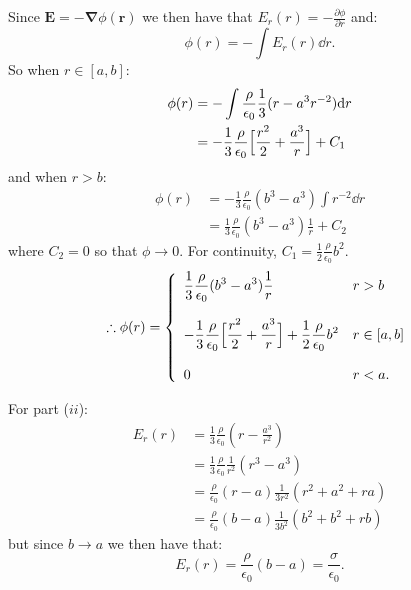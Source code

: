 \begin{enumerate}
    \newpage

    Since $\boldsymbol{E}=
    -\boldsymbol{\nabla}\phi
    (\boldsymbol{r})$ we then have that
    $E_r(r)=-\displaystyle
    \frac{\partial\phi}{\partial r}$
    and:
    $$\phi(r)=-\int E_r(r)\dd r.$$
    So when $r\in[a,b]$:
    \begin{align*}
        \phi(r)
        &=-\int\frac{\rho}{\epsilon_0}
        \frac{1}{3}(r-a^3 r^{-2})\dd r \\
        &=-\frac{1}{3}\frac{\rho}{\epsilon_0}
        \Bigl[\frac{r^2}{2}+\frac{a^3}{r}\Bigr]+C_1
    \end{align*}
    and when $r>b$:
    \begin{align*}
        \phi(r)
        &=-\frac{1}{3}
        \frac{\rho}{\epsilon_0}
        (b^3-a^3)
        \int r^{-2}\dd r \\
        &=\frac{1}{3}\frac{\rho}
        {\epsilon_0}(b^3-a^3)
        \frac{1}{r}+C_2
    \end{align*}
    where $C_2=0$ so that $\phi\rightarrow0$.
    For continuity, $C_1=\displaystyle
    \frac{1}{2}\frac{\rho}{\epsilon_0}b^2$.
    $$\therefore\phi(r)=
    \left\{
	\begin{array}{ll}
        \displaystyle\frac{1}{3}\frac{\rho}
        {\epsilon_0}(b^3-a^3)
        \frac{1}{r}
        & \mbox{$r>b$} \\\\
		\displaystyle-\frac{1}{3}\frac{\rho}{\epsilon_0}
        \Bigl[\frac{r^2}{2}+\frac{a^3}{r}\Bigr]
        +\frac{1}{2}\frac{\rho}{\epsilon_0}b^2
        & \mbox{$r\in[a,b]$} \\\\
		0 
        & \mbox{$r<a$.}
	\end{array}
    \right.$$


    For part ($ii$):
    \begin{align*}
        E_r(r)
        &=\frac{1}{3}
        \frac{\rho}{\epsilon_0}
        \left(r-\frac{a^3}{r^2}\right) \\
        &=\frac{1}{3}
        \frac{\rho}{\epsilon_0}\frac{1}{r^2}
        (r^3-a^3) \\
        &=\frac{\rho}{\epsilon_0}(r-a)
        \frac{1}{3r^2}(r^2+a^2+ra) \\
        &=\frac{\rho}{\epsilon_0}(b-a)
        \frac{1}{3b^2}(b^2+b^2+rb)
    \end{align*}
    but since $b\rightarrow a$ we then have that:
    $$E_r(r)=\frac{\rho}{\epsilon_0}(b-a)
    =\frac{\sigma}{\epsilon_0}.$$
    

\end{enumerate}
